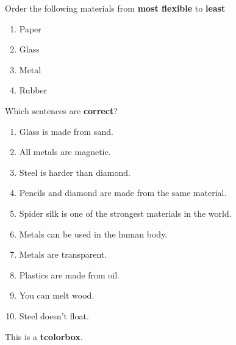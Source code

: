 \documentclass[a4paper, 12pt]{article}
\begin{document}
	\pagestyle{empty}
	\begin{question}
  		Order the following materials from \textbf{most flexible} to \textbf{least}
  		
  		\begin{enumerate}
  		\centering
  			\item Paper
  			\item Glass
  			\item Metal
  			\item Rubber
  		\end{enumerate}
	\end{question}
	\begin{question}
  		Which sentences are \textbf{correct}?
  		
  		\begin{multicols}{2}
  		\begin{enumerate}
  			\item Glass is made from sand.
  			\item All metals are magnetic.
  			\item Steel is harder than diamond.
  			\item Pencils and diamond are made from the same material.
  			\item Spider silk is one of the strongest materials in the world.
  			\item Metals can be used in the human body.
  			\item Metals are transparent.
  			\item Plastics are made from oil.
  			\item You can melt wood.
  			\item Steel doesn’t float.
  		\end{enumerate}
  		\end{multicols}
	\end{question}
	\newpage
	\begin{question}[My title]
  		This is a \textbf{tcolorbox}.
	\end{question}
\end{document}
